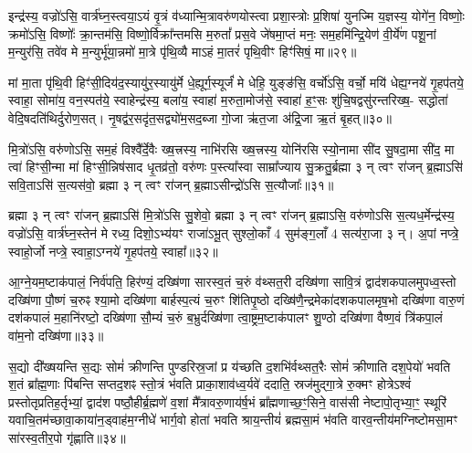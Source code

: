 {\anuvakamend[{अ॒ग्नेस्तैका॑दश च॥14॥}]}

इन्द्र॑स्य॒ वज्रो॑\-ऽसि॒ वार्त्र॑घ्न॒स्त्वया॒\-ऽयं वृ॒त्रं व॑ध्यान्मि॒त्रावरु॑णयोस्त्वा प्रशा॒स्त्रोः प्र॒शिषा॑ युनज्मि य॒ज्ञस्य॒ योगे॑न॒ विष्णोः॒ क्रमो॑\-ऽसि॒ विष्णोः᳚ क्रा॒न्तम॑सि॒ विष्णो॒र्विक्रा᳚न्तमसि म॒रुतां᳚ प्रस॒वे जे॑षमा॒प्तं मनः॒ सम॒हमि॑न्द्रि॒येण॑ वी॒र्ये॑ण पशू॒नां म॒न्युर॑सि॒ तवे॑व मे म॒न्युर्भू॑या॒न्नमो॑ मा॒त्रे पृ॑थि॒व्यै मा\-ऽहं मा॒तरं॑ पृथि॒वीꣳ हिꣳ॑सिषं॒ मा॥२९॥

मां मा॒ता पृ॑थि॒वी हिꣳ॑सी॒दिय॑द॒स्यायु॑र॒स्यायु॑र्मे धे॒ह्यूर्ग॒स्यूर्जं॑ मे धेहि॒ युङ्ङ॑सि॒ वर्चो॑\-ऽसि॒ वर्चो॒ मयि॑ धेह्य॒ग्नये॑ गृ॒हप॑तये॒ स्वाहा॒ सोमा॑य॒ वन॒स्पत॑ये॒ स्वाहेन्द्र॑स्य॒ बला॑य॒ स्वाहा॑ म॒रुता॒मोज॑से॒ स्वाहा॑ ह॒ꣳ॒सः शु॑चि॒षद्वसु॑रन्तरिख्ष॒- सद्धोता॑ वेदि॒षदति॑थिर्दुरोण॒सत्। नृ॒षद्व॑र॒सदृ॑त॒सद्व्यो॑म॒सद॒ब्जा गो॒जा ऋ॑त॒जा अ॑द्रि॒जा ऋ॒तं बृ॒हत्॥३०॥

{\anuvakamend[{हि॒ꣳ॒सि॒षं॒ मर्त॒जास्त्रीणि॑ च॥15॥}]}

मि॒त्रो॑\-ऽसि॒ वरु॑णो\-ऽसि॒ सम॒हं विश्वै᳚र्दे॒वैः ख्ष॒त्त्रस्य॒ नाभि॑रसि ख्ष॒त्त्रस्य॒ योनि॑रसि स्यो॒नामा सी॑द सु॒षदा॒मा सी॑द॒ मा त्वा॑ हिꣳसी॒न्मा मा॑ हिꣳसी॒न्निष॑साद धृ॒तव्र॑तो॒ वरु॑णः प॒स्त्या᳚स्वा साम्रा᳚ज्याय सु॒क्रतु॒र्ब्रह्मा ३ न् त्वꣳ रा॑जन् ब्र॒ह्मा\-ऽसि॑ सवि॒ता\-ऽसि॑ स॒त्यस॑वो॒ ब्रह्मा ३ न् त्वꣳ रा॑जन् ब्र॒ह्मा\-ऽसीन्द्रो॑\-ऽसि स॒त्यौजाः᳚॥३१॥

ब्रह्मा ३ न् त्वꣳ रा॑जन् ब्र॒ह्मा\-ऽसि॑ मि॒त्रो॑\-ऽसि सु॒शेवो॒ ब्रह्मा ३ न् त्वꣳ रा॑जन् ब्र॒ह्मा\-ऽसि॒ वरु॑णो\-ऽसि स॒त्यध॒र्मेन्द्र॑स्य॒ वज्रो॑\-ऽसि॒ वार्त्र॑घ्न॒स्तेन॑ मे रध्य॒ दिशो॒\-ऽभ्य॑यꣳ राजा॑\-ऽभू॒त् सुश्लो॒काँ 4 सुम॑ङ्ग॒लाँ 4 सत्य॑रा॒जा ३ न्। अ॒पां नप्त्रे॒ स्वाहो॒र्जो नप्त्रे॒ स्वाहा॒\-ऽग्नये॑ गृ॒हप॑तये॒ स्वाहा᳚॥३२॥

{\anuvakamend[{स॒त्यौजा᳚श्चत्वारि॒ꣳ॒शच्च॑॥16॥}]}

आ॒ग्ने॒यम॒ष्टाक॑पालं॒ निर्व॑पति॒ हिर॑ण्यं॒ दख्षि॑णा सारस्व॒तं च॒रुं व॑थ्सत॒री दख्षि॑णा सावि॒त्रं द्वाद॑शकपालमुपध्व॒स्तो दख्षि॑णा पौ॒ष्णं च॒रुꣴ श्या॒मो दख्षि॑णा बार्\mbox{}हस्प॒त्यं च॒रुꣳ शि॑तिपृ॒ष्ठो दख्षि॑णै॒न्द्रमेका॑दशकपालमृष॒भो दख्षि॑णा वारु॒णं दश॑कपालं म॒हानि॑रष्टो॒ दख्षि॑णा सौ॒म्यं च॒रुं ब॒भ्रुर्दख्षि॑णा त्वा॒ष्ट्रम॒ष्टाक॑पालꣳ शु॒ण्ठो दख्षि॑णा वैष्ण॒वं त्रि॑कपा॒लं वा॑म॒नो दख्षि॑णा॥३३॥

{\anuvakamend[{आ॒ग्ने॒यं द्विच॑त्वारिꣳशत्॥17॥}]}

स॒द्यो दी᳚ख्षयन्ति स॒द्यः सोमं॑ क्रीणन्ति पुण्डरिस्र॒जां प्र य॑च्छति द॒शभि॑र्वथ्सत॒रैः सोमं॑ क्रीणाति दश॒पेयो॑ भवति श॒तं ब्रा᳚ह्म॒णाः पि॑बन्ति सप्तद॒शꣴ स्तो॒त्रं भ॑वति प्राका॒शाव॑ध्व॒र्यवे॑ ददाति॒ स्रज॑मुद्गा॒त्रे रु॒क्मꣳ होत्रे\-ऽश्वं॑ प्रस्तोतृप्रतिह॒र्तृभ्यां॒ द्वाद॑श पष्ठौ॒हीर्ब्र॒ह्मणे॑ व॒शां मै᳚त्रावरु॒णाय॑र्\mbox{}ष॒भं ब्रा᳚ह्मणाच्छ॒ꣳ॒सिने॒ वास॑सी नेष्टापो॒तृभ्या॒ꣳ॒ स्थूरि॑ यवाचि॒तम॑च्छावा॒काया॑न॒ड्वाह॑म॒ग्नीधे॑ भार्ग॒वो होता॑ भवति श्राय॒न्तीयं॑ ब्रह्मसा॒मं भ॑वति वारव॒न्तीय॑मग्निष्टोमसा॒मꣳ सा॑रस्व॒तीर॒पो गृ॑ह्णाति॥३४॥

